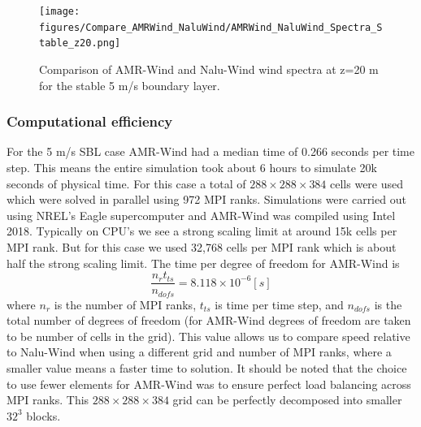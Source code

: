 \begin{figure} %
  \centering
  \texttt{[image: figures/Compare\_AMRWind\_NaluWind/AMRWind\_NaluWind\_Spectra\_Stable\_z20.png]}

  \caption{\label{fig:CompareAMRvsNaluSpectra} Comparison of AMR-Wind
    and Nalu-Wind wind spectra at z=20 m for the stable 5 m/s boundary
    layer. }
\end{figure}




\subsubsection{Computational efficiency}

For the 5 m/s SBL case AMR-Wind had a median time of 0.266 seconds per time step.
This means the entire simulation took about 6 hours to simulate 20k seconds
of physical time. For this case a total of $288\times 288 \times 384$ cells were used
which were solved in parallel using 972 MPI ranks. Simulations were carried out using NREL's
Eagle supercomputer and AMR-Wind was compiled using Intel 2018.
Typically on CPU's we see a strong scaling limit at around 15k cells per MPI rank.
But for this case we used 32,768 cells per MPI rank which is about half the strong scaling limit.
The time per degree of freedom for AMR-Wind is
\[\frac{n_r t_{ts} }{n_{dofs}} = 8.118\times10^{-6} [s]\]
where $n_r$ is the number of MPI ranks, $t_{ts}$ is time per time step, and $n_{dofs}$ is
the total number of degrees of freedom (for AMR-Wind degrees of freedom are taken to be
 number of cells in the grid). This value allows us to compare speed relative to 
Nalu-Wind when using a different grid and number of MPI ranks, where a smaller value 
means a faster time to solution. It should be noted that the choice to use fewer 
elements for AMR-Wind was to ensure perfect load balancing across MPI ranks. This 
$288 \times 288 \times 384$ grid can be perfectly decomposed into smaller $32^3$ blocks.

